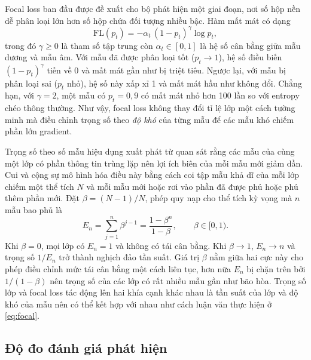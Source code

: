 Focal loss \cite{lin2017focal} ban đầu được đề xuất cho bộ phát hiện một giai đoạn, nơi số hộp nền dễ phân loại lớn hơn số hộp chứa đối tượng nhiều bậc. Hàm mất mát có dạng
\begin{equation}
\mathrm{FL}(p_t) = -\alpha_t\,(1 - p_t)^{\gamma}\log p_t,
\label{eq:focal-general}
\end{equation}
trong đó $\gamma \geq 0$ là tham số tập trung còn $\alpha_t \in [0, 1]$ là hệ số cân bằng giữa mẫu dương và mẫu âm. Với mẫu đã được phân loại tốt ($p_t \to 1$), hệ số điều biến $(1 - p_t)^{\gamma}$ tiến về 0 và mất mát gần như bị triệt tiêu. Ngược lại, với mẫu bị phân loại sai ($p_t$ nhỏ), hệ số này xấp xỉ 1 và mất mát hầu như không đổi. Chẳng hạn, với $\gamma = 2$, một mẫu có $p_t = 0{,}9$ có mất mát nhỏ hơn 100 lần so với entropy chéo thông thường. Như vậy, focal loss không thay đổi tỉ lệ lớp một cách tường minh mà điều chỉnh trọng số theo \emph{độ khó} của từng mẫu để các mẫu khó chiếm phần lớn gradient.

Trọng số theo số mẫu hiệu dụng xuất phát từ quan sát rằng các mẫu của cùng một lớp có phần thông tin trùng lặp nên lợi ích biên của mỗi mẫu mới giảm dần. Cui và cộng sự \cite{cui2019classbalanced} mô hình hóa điều này bằng cách coi tập mẫu khả dĩ của mỗi lớp chiếm một thể tích $N$ và mỗi mẫu mới hoặc rơi vào phần đã được phủ hoặc phủ thêm phần mới. Đặt $\beta = (N - 1)/N$, phép quy nạp cho thể tích kỳ vọng mà $n$ mẫu bao phủ là
\begin{equation}
E_n = \sum_{j=1}^{n} \beta^{j-1} = \frac{1 - \beta^{n}}{1 - \beta}, \qquad \beta \in [0, 1).
\label{eq:effnum}
\end{equation}
Khi $\beta = 0$, mọi lớp có $E_n = 1$ và không có tái cân bằng. Khi $\beta \to 1$, $E_n \to n$ và trọng số $1/E_n$ trở thành nghịch đảo tần suất. Giá trị $\beta$ nằm giữa hai cực này cho phép điều chỉnh mức tái cân bằng một cách liên tục, hơn nữa $E_n$ bị chặn trên bởi $1/(1 - \beta)$ nên trọng số của các lớp có rất nhiều mẫu gần như bão hòa. Trọng số lớp và focal loss tác động lên hai khía cạnh khác nhau là tần suất của lớp và độ khó của mẫu nên có thể kết hợp với nhau như cách luận văn thực hiện ở \cref{eq:focal}.

\subsection{Độ đo đánh giá phát hiện}
\label{sec:detection-metrics}

